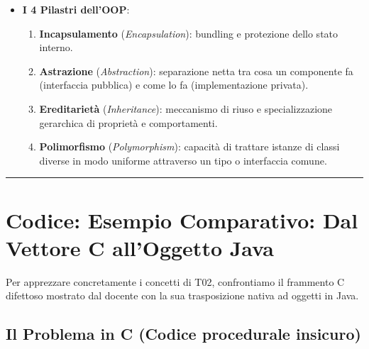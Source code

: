 \documentclass[11pt,a4paper,oneside]{report}
\newcommand{\passthrough}[1]{#1}
\providecommand{\tightlist}{\setlength{\itemsep}{0pt}\setlength{\parskip}{0pt}}
\begin{document}
\begin{itemize}
  \begin{itemize}
  \tightlist
  \item
    \textbf{Associazione standard}: linea continua con cardinalità (es.
    \passthrough{\lstinline!1!} a \passthrough{\lstinline!0..n!} tra
    \passthrough{\lstinline!Insurance!} e
    \passthrough{\lstinline!Vehicle!}).
  \item
    \textbf{Ereditarietà (Generalizzazione)}: freccia con punta
    triangolare vuota orientata verso la superclasse
    (\passthrough{\lstinline!Car!} estende
    \passthrough{\lstinline!Vehicle!}, \passthrough{\lstinline!Truck!}
    estende \passthrough{\lstinline!Vehicle!}).
  \end{itemize}
\item
  \textbf{I 4 Pilastri dell'OOP}:

  \begin{enumerate}
  \def\labelenumi{\arabic{enumi}.}
  \tightlist
  \item
    \textbf{Incapsulamento} (\emph{Encapsulation}): bundling e
    protezione dello stato interno.
  \item
    \textbf{Astrazione} (\emph{Abstraction}): separazione netta tra cosa
    un componente fa (interfaccia pubblica) e come lo fa
    (implementazione privata).
  \item
    \textbf{Ereditarietà} (\emph{Inheritance}): meccanismo di riuso e
    specializzazione gerarchica di proprietà e comportamenti.
  \item
    \textbf{Polimorfismo} (\emph{Polymorphism}): capacità di trattare
    istanze di classi diverse in modo uniforme attraverso un tipo o
    interfaccia comune.
  \end{enumerate}
\end{itemize}

\begin{center}\rule{0.5\linewidth}{0.5pt}\end{center}

\section{Codice: Esempio Comparativo: Dal Vettore C all'Oggetto
Java}\label{chap02_codice-esempio-comparativo-dal-vettore-c-alloggetto-java}

Per apprezzare concretamente i concetti di T02, confrontiamo il
frammento C difettoso mostrato dal docente con la sua trasposizione
nativa ad oggetti in Java.

\subsection{Il Problema in C (Codice procedurale
insicuro)}\label{chap02_il-problema-in-c-codice-procedurale-insicuro}
\end{document}
